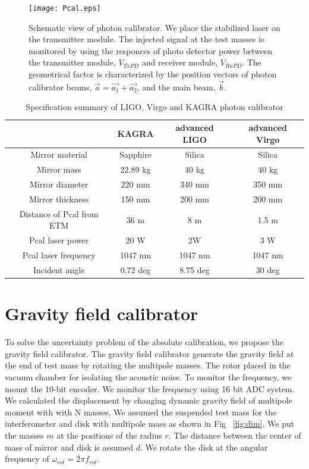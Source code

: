 \documentclass[A4]{spie}  %
\begin{document}
\begin{figure}
\begin{center}
\texttt{[image: Pcal.eps]}
\caption{Schematic view of photon calibrator. We place the stabilized laser on the transmitter module. The injected signal at the test masses is monitored by using the responces of photo detector power between the transmitter module, $V_{TxPD}$ and  receiver module, $V_{RxPD}$.  The geometrical factor is characterized by the position vectors of photon calibrator beams, $\vec{a}=\vec{a_1}+\vec{a_2}$, and the main beam, $\vec{b}$.}
\label{fig:Pcal}
\end{center}
\end{figure}

\begin{table}
\begin{center}
\caption{Specification summary of LIGO, Virgo and KAGRA photon calibrator\label{pcal}}
\footnotesize
\begin{tabular}{cccc}
\hline
& KAGRA& advanced LIGO& advanced Virgo \\
\hline
Mirror material & Sapphire & Silica & Silica \\
 Mirror mass & 22.89 kg & 40 kg & 40 kg \\
  Mirror diameter & 220 mm & 340 mm & 350 mm \\
    Mirror thickness & 150 mm & 200 mm & 200 mm \\
 Distance of Pcal from ETM & 36 m & 8 m & 1.5 m \\
  Pcal laser power & 20 W & 2W & 3 W \\
  Pcal laser frequency & 1047 nm & 1047 nm &1047 nm\\
  Incident angle& 0.72 deg & 8.75 deg &30 deg \\
  \hline
\end{tabular}
\end{center}
\end{table}

\section{Gravity field calibrator} \label{sec:Gcal}
To solve the uncertainty problem of the absolute calibration, we propose the gravity field calibrator. The gravity field calibrator generate the gravity field at the end of test mass by rotating the multipole masses. The rotor placed in the vacuum chamber for isolating the acoustic noise. To monitor the frequency, we mount the 10-bit encoder. We monitor the frequency using 16 bit ADC system.
We calculated the displacement by changing dynamic gravity field of multipole moment with with N masses.
We assumed the suspended test mass for the interferometer and disk with multipole mass as shown in Fig ~\ref{fig:dim}.
We put the masses $m$ at the positions of the radius $r$. The distance between the center of mass of mirror and disk is assumed $d$.
We rotate the disk at the angular frequency of $\omega_{rot}=2\pi f_{rot}$.
\end{document}
